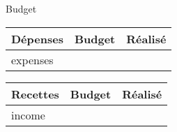 \documentclass[10 pt]{report}
\begin{document}
\centerline{\Huge Budget}

\begin{minipage}[t]{.47\textwidth}
  \vspace{0pt}
  \begin{tabu} to \linewidth {|X|r|r|}
    \hline
    Dépenses & Budget & Réalisé \\
    \hline
    \hline
    {{expenses}}
    \hline
  \end{tabu}
  \vfill
\end{minipage}
\begin{minipage}[t]{.47\textwidth}
  \vspace{0pt}
  \begin{tabu} to \linewidth {|X|r|r|}
    \hline
    Recettes & Budget & Réalisé \\
    \hline
    \hline
    {{income}}
    \hline
  \end{tabu}
  \vfill
\end{minipage}
\end{document}
